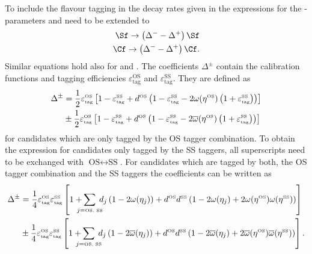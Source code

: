 To include the flavour tagging in the decay rates given in  the expressions for the \CP-parameters \Sf and \Cf need to be extended to
\begin{equation}
\begin{aligned}
\Sf\to\left(\Delta^--\Delta^+\right)\Sf\\
\Cf\to\left(\Delta^--\Delta^+\right)\Cf.
\end{aligned}
\end{equation}
Similar equations hold also for \Sfbar and \Cfbar.
The coefficients $\Delta^\pm$ contain the calibration functions and tagging efficiencies $\varepsilon_{\text{tag}}^{\text{OS}}$ and $\varepsilon_{\text{tag}}^{\text{SS}}$.
They are defined as
\begin{align}
\Delta^\pm&=\frac{1}{2}\varepsilon_{\text{\tiny tag}}^{\text{\tiny OS}}\left[1-\varepsilon_{\text{\tiny tag}}^{\text{\tiny SS}}+d^{\text{\tiny OS}}\left(1-\varepsilon_{\text{\tiny tag}}^{\text{\tiny SS}}-2\omega(\eta^{\text{\tiny OS}})\left(1+\varepsilon_{\text{\tiny tag}}^{\text{\tiny SS}}\right)\right)\right]\nonumber\\
&\pm\frac{1}{2}\varepsilon_{\text{\tiny tag}}^{\text{\tiny OS}}\left[1-\varepsilon_{\text{\tiny tag}}^{\text{\tiny SS}}+d^{\text{\tiny OS}}\left(1-\varepsilon_{\text{\tiny tag}}^{\text{\tiny SS}}-2\overline{\omega}(\eta^{\text{\tiny OS}})\left(1+\varepsilon_{\text{\tiny tag}}^{\text{\tiny SS}}\right)\right)\right]
\end{align}
for candidates which are only tagged by the OS tagger combination.
To obtain the expression for candidates only tagged by the SS taggers, all superscripts need to be exchanged with $\text{OS}\leftrightarrow\text{SS}$.
For candidates which are tagged by both, the OS tagger combination and the SS taggers the coefficients can be written as
\begin{align}
\Delta^\pm&=\frac{1}{4}\varepsilon_{\text{\tiny tag}}^{\text{\tiny OS}}\varepsilon_{\text{\tiny tag}}^{\text{\tiny SS}}\left[1+\hspace{-3mm}\sum_{j=\text{\tiny OS, SS}}\hspace{-2mm}d_j\left(1-2\omega(\eta_j)\right)+d^{\text{\tiny OS}}d^{\text{\tiny SS}}\left(1-2\omega(\eta_j)+2\omega(\eta^{\text{\tiny OS}})\omega(\eta^{\text{\tiny SS}})\right)\right]\nonumber\\
&\pm\frac{1}{4}\varepsilon_{\text{\tiny tag}}^{\text{\tiny OS}}\varepsilon_{\text{\tiny tag}}^{\text{\tiny SS}}\left[1+\hspace{-3mm}\sum_{j=\text{\tiny OS, SS}}\hspace{-2mm}d_j\left(1-2\overline{\omega}(\eta_j)\right)+d^{\text{\tiny OS}}d^{\text{\tiny SS}}\left(1-2\overline{\omega}(\eta_j)+2\overline{\omega}(\eta^{\text{\tiny OS}})\overline{\omega}(\eta^{\text{\tiny SS}})\right)\right].
\end{align}

